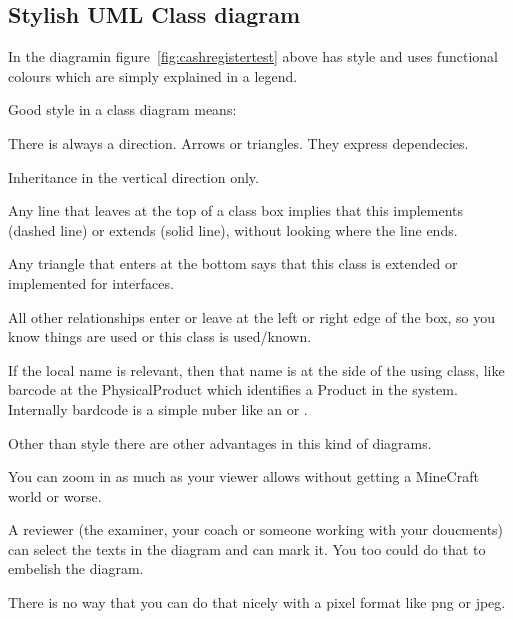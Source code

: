 \subsection{Stylish UML Class diagram}
In the diagramin figure~\vref{fig:cashregistertest} above has style and uses functional colours which are simply explained in a legend.

Good style in a class diagram means:
\begin{Itemize}
\item There is always a direction. Arrows or triangles. They express dependecies.
\item Inheritance in the vertical direction only.
  \begin{Itemize}
    \item Any line that leaves at the top of a class box implies that this
      implements (dashed line) or extends (solid line), without looking where the line ends.
    \item Any triangle that enters at the bottom says that this class is extended or implemented for interfaces.
  \end{Itemize}
  \item All other relationships enter or leave at the left or right edge of the box, so you know things are used
  or this class is used/known.
  \begin{Itemize}
  \item If the local name is relevant, then that name is at the side of the using class, like barcode at the PhysicalProduct which identifies a Product in the system. Internally bardcode is a simple nuber like an  or .
  \end{Itemize}
\end{Itemize}

Other than style there are other advantages in this kind of diagrams.
\begin{Itemize}
\item You can zoom in as much as your viewer allows without getting a MineCraft world or worse.
\item A reviewer (the examiner, your coach or someone working with your doucments) can select the texts in the diagram and can mark it. You too could do that to embelish the diagram.
\item There is no way that you can do that nicely with a pixel format like png or jpeg.
\end{Itemize}

